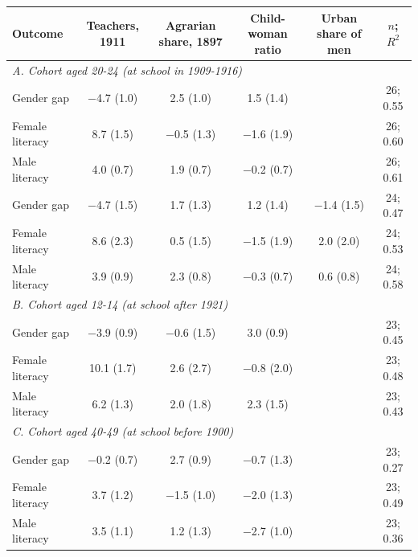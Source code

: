\begin{tabular}{lccccc}
\toprule
Outcome & Teachers, 1911 & Agrarian share, 1897 & Child-woman ratio & Urban share of men & $n$; $R^2$ \\
\midrule
\multicolumn{6}{l}{\textit{A. Cohort aged 20-24 (at school in 1909-1916)}} \\
Gender gap & $-$4.7 (1.0) & 2.5 (1.0) & 1.5 (1.4) & & 26; 0.55 \\
Female literacy & 8.7 (1.5) & $-$0.5 (1.3) & $-$1.6 (1.9) & & 26; 0.60 \\
Male literacy & 4.0 (0.7) & 1.9 (0.7) & $-$0.2 (0.7) & & 26; 0.61 \\
Gender gap & $-$4.7 (1.5) & 1.7 (1.3) & 1.2 (1.4) & $-$1.4 (1.5) & 24; 0.47 \\
Female literacy & 8.6 (2.3) & 0.5 (1.5) & $-$1.5 (1.9) & 2.0 (2.0) & 24; 0.53 \\
Male literacy & 3.9 (0.9) & 2.3 (0.8) & $-$0.3 (0.7) & 0.6 (0.8) & 24; 0.58 \\
\multicolumn{6}{l}{\textit{B. Cohort aged 12-14 (at school after 1921)}} \\
Gender gap & $-$3.9 (0.9) & $-$0.6 (1.5) & 3.0 (0.9) & & 23; 0.45 \\
Female literacy & 10.1 (1.7) & 2.6 (2.7) & $-$0.8 (2.0) & & 23; 0.48 \\
Male literacy & 6.2 (1.3) & 2.0 (1.8) & 2.3 (1.5) & & 23; 0.43 \\
\multicolumn{6}{l}{\textit{C. Cohort aged 40-49 (at school before 1900)}} \\
Gender gap & $-$0.2 (0.7) & 2.7 (0.9) & $-$0.7 (1.3) & & 23; 0.27 \\
Female literacy & 3.7 (1.2) & $-$1.5 (1.0) & $-$2.0 (1.3) & & 23; 0.49 \\
Male literacy & 3.5 (1.1) & 1.2 (1.3) & $-$2.7 (1.0) & & 23; 0.36 \\
\bottomrule
\end{tabular}
